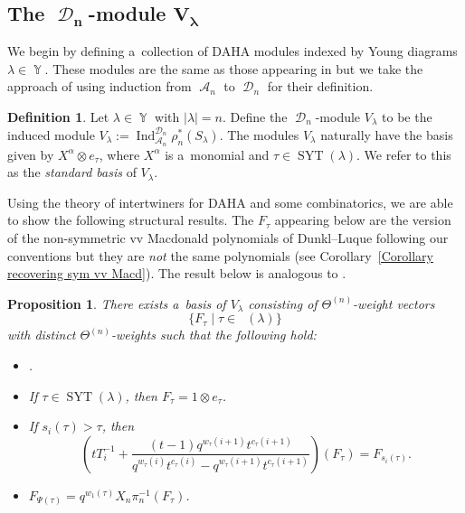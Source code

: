 \documentclass[pdftex]{sigma}
\numberwithin{equation}{section}
\newtheorem{Proposition}[Theorem]{Proposition}
\theoremstyle{definition}
\newtheorem{Definition}[Theorem]{Definition}
\DeclareMathOperator{\Par}{\mathbb{Y}}
\DeclareMathOperator{\SYT}{\mathrm{SYT}}
\DeclareMathOperator{\PSYT}{\mathrm{PSYT}_{\geq 0}}
\DeclareMathOperator{\sA}{\mathscr{A}}
\DeclareMathOperator{\sD}{\mathscr{D}}
\DeclareMathOperator{\Ind}{Ind}
\begin{document}
\subsection[The D\_n-module V\_lambda]{The $\boldsymbol{\sD_n}$-module $\boldsymbol{V_{\lambda}}$}
 We begin by defining a~collection of DAHA modules indexed by Young diagrams $\lambda \in \Par$. These modules are the same as those appearing in \cite[Definition 3.1]{DL_2011} but we take the approach of using induction from $\sA_n$ to $\sD_n$ for their definition.

 \begin{Definition}
 Let $\lambda \in \Par$ with $|\lambda| = n$. Define the $\sD_n$-module $V_{\lambda}$ to be the induced module
 $V_{\lambda}:= \Ind_{\sA_n}^{\sD_n}\rho_n^{*}(S_{\lambda})$. The modules $V_{\lambda}$ naturally have the basis given by $X^{\alpha}\otimes e_{\tau}$, where $X^{\alpha}$ is a~monomial and $\tau \in \SYT(\lambda)$. We refer to this as the \textit{standard basis} of $V_{\lambda}$.
 \end{Definition}

Using the theory of intertwiners for DAHA and some combinatorics, we are able to show the following structural results. The $F_{\tau}$ appearing below are the version of the non-symmetric vv Macdonald polynomials of Dunkl--Luque following our conventions but they are \textit{not} the same polynomials (see Corollary~\ref{Corollary recovering sym vv Macd}). The result below is analogous to \cite[Theorem 4.12]{DL_2011}.

\begin{Proposition}\label{weight basis Proposition}
 There exists a~basis of $V_{\lambda}$ consisting of $\Theta^{(n)}$-weight vectors \[
 \{F_{\tau}\mid \tau \in \PSYT(\lambda)\}\] with distinct $\Theta^{(n)}$-weights such that the following hold:
 \begin{itemize}
\itemsep=0pt
 \item {}.
 \item If $\tau \in \SYT(\lambda)$, then $F_{\tau} = 1\otimes e_{\tau}$.
 \item If $s_i(\tau) > \tau$, then
 \[
 \left( tT_{i}^{-1} + \frac{(t-1)q^{w_{\tau}(i+1)}t^{c_{\tau}(i+1)}}{q^{w_{\tau}(i)}t^{c_{\tau}(i)}-q^{w_{\tau}(i+1)}t^{c_{\tau}(i+1)}}\right)(F_{\tau}) = F_{s_i(\tau)}.
 \]
 \item $F_{\Psi(\tau)} = q^{w_1(\tau)}X_n\pi_n^{-1}(F_{\tau})$.
 \end{itemize}
\end{Proposition}
\end{document}
